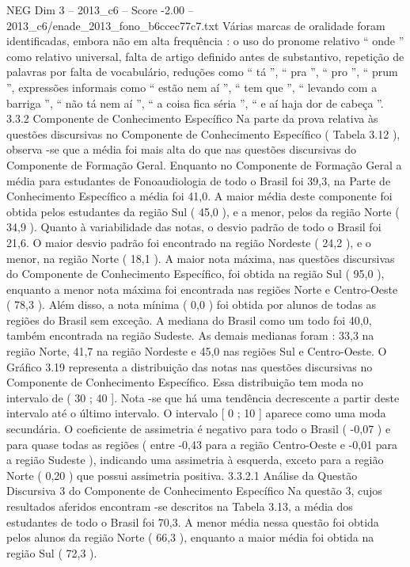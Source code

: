 \begin{textsample}{NEG Dim 3 – 2013\_c6 – Score -2.00 – 2013\_c6/enade\_2013\_fono\_b6ccec77c7.txt}
Várias marcas de oralidade foram identificadas, embora não em alta frequência : o uso do pronome relativo “ onde ” como relativo universal, falta de artigo definido antes de substantivo, repetição de palavras por falta de vocabulário, reduções como “ tá ”, “ pra ”, “ pro ”, “ prum ”, expressões informais como “ estão nem aí ”, “ tem que ”, “ levando com a barriga ”, “ não tá nem aí ”, “ a coisa fica séria ”, “ e aí haja dor de cabeça ”. 3.3.2 Componente de Conhecimento Específico Na parte da prova relativa às questões discursivas no Componente de Conhecimento Específico ( Tabela 3.12 ), observa -se que a média foi mais alta do que nas questões discursivas do Componente de Formação Geral.
Enquanto no Componente de Formação Geral a média para estudantes de Fonoaudiologia de todo o Brasil foi 39,3, na Parte de Conhecimento Específico a média foi 41,0.
A maior média deste componente foi obtida pelos estudantes da região Sul ( 45,0 ), e a menor, pelos da região Norte ( 34,9 ).
Quanto à variabilidade das notas, o desvio padrão de todo o Brasil foi 21,6.
O maior desvio padrão foi encontrado na região Nordeste ( 24,2 ), e o menor, na região Norte ( 18,1 ).
A maior nota máxima, nas questões discursivas do Componente de Conhecimento Específico, foi obtida na região Sul ( 95,0 ), enquanto a menor nota máxima foi encontrada nas regiões Norte e Centro-Oeste ( 78,3 ).
Além disso, a nota mínima ( 0,0 ) foi obtida por alunos de todas as regiões do Brasil sem exceção.
A mediana do Brasil como um todo foi 40,0, também encontrada na região Sudeste.
As demais medianas foram : 33,3 na região Norte, 41,7 na região Nordeste e 45,0 nas regiões Sul e Centro-Oeste.
O Gráfico 3.19 representa a distribuição das notas nas questões discursivas no Componente de Conhecimento Específico.
Essa distribuição tem moda no intervalo de ( 30 ; 40 ].
Nota -se que há uma tendência decrescente a partir deste intervalo até o último intervalo.
O intervalo [ 0 ; 10 ] aparece como uma moda secundária.
O coeficiente de assimetria é negativo para todo o Brasil ( -0,07 ) e para quase todas as regiões ( entre -0,43 para a região Centro-Oeste e -0,01 para a região Sudeste ), indicando uma assimetria à esquerda, exceto para a região Norte ( 0,20 ) que possui assimetria positiva. 3.3.2.1 Análise da Questão Discursiva 3 do Componente de Conhecimento Específico Na questão 3, cujos resultados aferidos encontram -se descritos na Tabela 3.13, a média dos estudantes de todo o Brasil foi 70,3.
A menor média nessa questão foi obtida pelos alunos da região Norte ( 66,3 ), enquanto a maior média foi obtida na região Sul ( 72,3 ).

\end{textsample}
